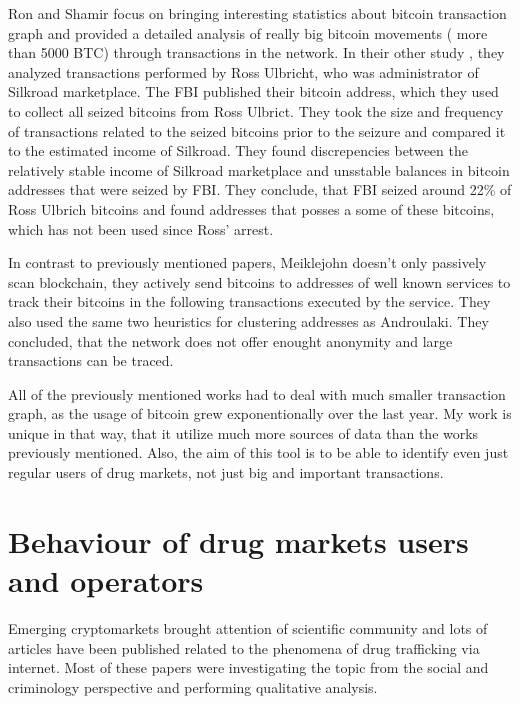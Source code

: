 \documentclass[
  digital, %
  table,   %
  lof,     %
  lot,     %
  oneside
]{fithesis3}
\begin{document}
Ron and Shamir \parencite{ron2013quantitative} focus on bringing
interesting statistics about bitcoin transaction graph
and provided a detailed analysis of really big bitcoin movements ( more than 5000 BTC) 
through transactions in the network.
In their other study \parencite{ron2014did}, they analyzed transactions performed by Ross Ulbricht,
who was administrator of Silkroad marketplace.
The FBI published their bitcoin address, which they used to collect all seized bitcoins from Ross Ulbrict.
They took the size and frequency of transactions related to the seized bitcoins prior to the seizure and compared 
it to the estimated income of Silkroad. They found discrepencies between the
relatively stable income of Silkroad marketplace and unsstable balances in bitcoin addresses
that were seized by FBI. They conclude, that FBI seized around 22\% of Ross Ulbrich bitcoins
and found addresses that posses a some of these bitcoins, which has not been used since Ross' arrest.

In contrast to previously mentioned papers, Meiklejohn \parencite{meiklejohn2013fistful} 
doesn't only passively scan blockchain, they actively send bitcoins to addresses of
well known services to track their bitcoins in the following transactions executed by the service.
They also used the same two heuristics for clustering addresses
as Androulaki. \parencite{androulaki2013evaluating}
They concluded, that the network does not offer enought anonymity and large transactions can be traced.

All of the previously mentioned works had to deal with much smaller transaction graph, as the usage of bitcoin grew exponentionally over the last year. 
My work is unique in that way, that it utilize much more sources of data than the works previously mentioned. Also, the aim of this tool is to be able
to identify even just regular users of drug markets, not just big and important transactions.

\section{Behaviour of drug markets users and operators}

Emerging cryptomarkets brought attention of scientific community
and lots of articles have been published related to the phenomena of drug trafficking via internet.
Most of these papers were investigating the topic from the social
and criminology perspective and performing qualitative analysis.
\parencite{aldridge2014not}
\parencite{barratt2014use}
\parencite{christin2013traveling}
\parencite{dolliver2015criminogenic}
\parencite{van2013silk}
\parencite{walsh2011drugs}
\parencite{martin2014lost}
\end{document}
